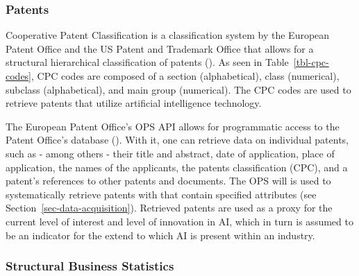 \documentclass[
  11,
  a4paperpaper,
]{article}
\begin{document}
\subsubsection{Patents}\label{patents}

Cooperative Patent Classification is a classification system by the
European Patent Office and the US Patent and Trademark Office that
allows for a structural hierarchical classification of patents
(). As seen in Table~\ref{tbl-cpc-codes}, CPC codes
are composed of a section (alphabetical), class (numerical), subclass
(alphabetical), and main group (numerical). The CPC codes are used to
retrieve patents that utilize artificial intelligence technology.

The European Patent Office's OPS API allows for programmatic access to
the Patent Office's database
(). With it, one can retrieve data on individual patents, such as -
among others - their title and abstract, date of application, place of
application, the names of the applicants, the patents classification
(CPC), and a patent's references to other patents and documents. The OPS
will is used to systematically retrieve patents with that contain
specified attributes (see Section~\ref{sec-data-acquisition}). Retrieved
patents are used as a proxy for the current level of interest and level
of innovation in AI, which in turn is assumed to be an indicator for the
extend to which AI is present within an industry.

\subsubsection{Structural Business
Statistics}\label{structural-business-statistics}
\end{document}
